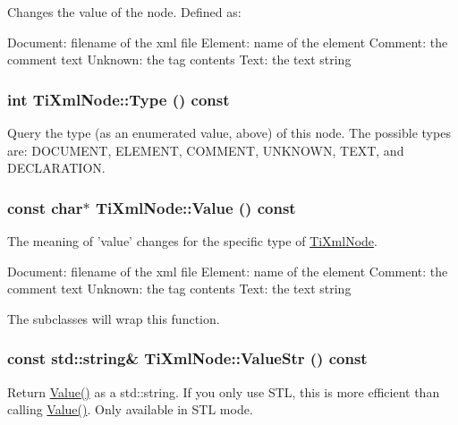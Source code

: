 \label{class_ti_xml_node_a2a38329ca5d3f28f98ce932b8299ae90}
Changes the value of the node. Defined as: \begin{DoxyVerb}
		Document:	filename of the xml file
		Element:	name of the element
		Comment:	the comment text
		Unknown:	the tag contents
		Text:		the text string
		\end{DoxyVerb}
 \hypertarget{class_ti_xml_node_a57b99d5c97d67a42b9752f5210a1ba5e}{
\subsubsection[{Type}]{\setlength{\rightskip}{0pt plus 5cm}int TiXmlNode::Type () const}}
\label{class_ti_xml_node_a57b99d5c97d67a42b9752f5210a1ba5e}
Query the type (as an enumerated value, above) of this node. The possible types are: DOCUMENT, ELEMENT, COMMENT, UNKNOWN, TEXT, and DECLARATION. \hypertarget{class_ti_xml_node_a77943eb90d12c2892b1337a9f5918b41}{
\subsubsection[{Value}]{\setlength{\rightskip}{0pt plus 5cm}const char$\ast$ TiXmlNode::Value () const}}
\label{class_ti_xml_node_a77943eb90d12c2892b1337a9f5918b41}
The meaning of 'value' changes for the specific type of \hyperlink{class_ti_xml_node}{TiXmlNode}. \begin{DoxyVerb}
		Document:	filename of the xml file
		Element:	name of the element
		Comment:	the comment text
		Unknown:	the tag contents
		Text:		the text string
		\end{DoxyVerb}


The subclasses will wrap this function. \hypertarget{class_ti_xml_node_a6d9e505619d39bf50bfd9609c9169ea5}{
\subsubsection[{ValueStr}]{\setlength{\rightskip}{0pt plus 5cm}const std::string\& TiXmlNode::ValueStr () const}}
\label{class_ti_xml_node_a6d9e505619d39bf50bfd9609c9169ea5}
Return \hyperlink{class_ti_xml_node_a77943eb90d12c2892b1337a9f5918b41}{Value()} as a std::string. If you only use STL, this is more efficient than calling \hyperlink{class_ti_xml_node_a77943eb90d12c2892b1337a9f5918b41}{Value()}. Only available in STL mode. 

